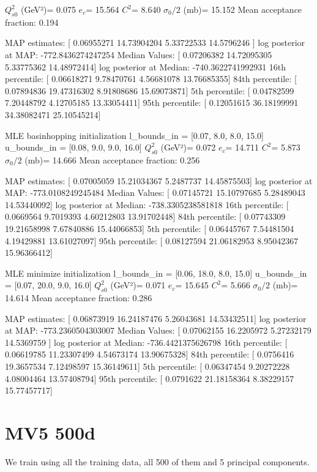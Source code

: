 \documentclass{article}
\begin{document}
$Q_{s0}^{2}$ (GeV²)= 0.075
$e_c$= 15.564
$C^{2}$= 8.640
$\sigma_0/2$ (mb)= 15.152
Mean acceptance fraction: 0.194

MAP estimates:  [ 0.06955271 14.73904204  5.33722533 14.5796246 ]
log posterior at MAP:  -772.8436274247254
Median Values:  [ 0.07206382 14.72095305  5.33775362 14.48972414]
log posterior at Median:  -740.3622741992931
16th percentile:  [ 0.06618271  9.78470761  4.56681078 13.76685355]
84th percentile:  [ 0.07894836 19.47316302  8.91808686 15.69073871]
5th percentile:  [ 0.04782599  7.20448792  4.12705185 13.33054411]
95th percentile:  [ 0.12051615 36.18199991 34.38082471 25.10545214]

MLE basinhopping initialization
l_bounds_in = [0.07, 8.0, 8.0, 15.0]
u_bounds_in = [0.08, 9.0, 9.0, 16.0]
$Q_{s0}^{2}$ (GeV²)= 0.072
$e_c$= 14.711
$C^{2}$= 5.873
$\sigma_0/2$ (mb)= 14.666
Mean acceptance fraction: 0.256

MAP estimates:  [ 0.07005059 15.21034367  5.2487737  14.45875503]
log posterior at MAP:  -773.0108249245484
Median Values:  [ 0.07145721 15.10797685  5.28489043 14.53440092]
log posterior at Median:  -738.3305238581818
16th percentile:  [ 0.0669564   9.7019393   4.60212803 13.91702448]
84th percentile:  [ 0.07743309 19.21658998  7.67840886 15.44066853]
5th percentile:  [ 0.06445767  7.54481504  4.19429881 13.61027097]
95th percentile:  [ 0.08127594 21.06182953  8.95042367 15.96366412]

MLE minimize initialization
l_bounds_in = [0.06, 18.0, 8.0, 15.0]
u_bounds_in = [0.07, 20.0, 9.0, 16.0]
$Q_{s0}^{2}$ (GeV²)= 0.071
$e_c$= 15.645
$C^{2}$= 5.666
$\sigma_0/2$ (mb)= 14.614
Mean acceptance fraction: 0.286


MAP estimates:  [ 0.06873919 16.24187476  5.26043681 14.53432511]
log posterior at MAP:  -773.2360504303007
Median Values:  [ 0.07062155 16.2205972   5.27232179 14.5369759 ]
log posterior at Median:  -736.4421375626798
16th percentile:  [ 0.06619785 11.23307499  4.54673174 13.90675328]
84th percentile:  [ 0.0756416  19.3657534   7.12498597 15.36149611]
5th percentile:  [ 0.06347454  9.20272228  4.08004464 13.57408794]
95th percentile:  [ 0.0791622  21.18158364  8.38229157 15.77457717]

\section{MV5 500d}

We train using all the training data, all 500 of them and 5 principal components. 
\end{document}
